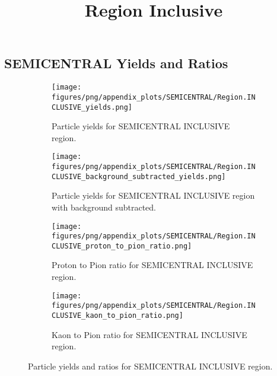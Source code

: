                 \subsection{SEMICENTRAL Yields and Ratios}
                \begin{figure}[H]
                    \title{Region Inclusive}
                    \begin{subfigure}[b]{0.5\textwidth}
                        \centering
                        \texttt{[image: figures/png/appendix\_plots/SEMICENTRAL/Region.INCLUSIVE\_yields.png]}
                        \caption{Particle yields for SEMICENTRAL INCLUSIVE region.}
                        \label{fig:appendix_SEMICENTRAL_INCLUSIVE_Inclusive_Yields}
                    \end{subfigure}
                    \begin{subfigure}[b]{0.5\textwidth}
                        \centering
                        \texttt{[image: figures/png/appendix\_plots/SEMICENTRAL/Region.INCLUSIVE\_background\_subtracted\_yields.png]}
                        \caption{Particle yields for SEMICENTRAL INCLUSIVE region with background subtracted.}
                        \label{fig:appendix_SEMICENTRAL_INCLUSIVE_Inclusive_Yields_Background_Subtracted}
                    \end{subfigure}
                    \begin{subfigure}[b]{0.5\textwidth}
                        \centering
                        \texttt{[image: figures/png/appendix\_plots/SEMICENTRAL/Region.INCLUSIVE\_proton\_to\_pion\_ratio.png]}
                        \caption{Proton to Pion ratio for SEMICENTRAL INCLUSIVE region.}
                        \label{fig:appendix_SEMICENTRAL_INCLUSIVE_Proton_to_Pion_Ratio}
                    \end{subfigure}
                    \begin{subfigure}[b]{0.5\textwidth}
                        \centering
                        \texttt{[image: figures/png/appendix\_plots/SEMICENTRAL/Region.INCLUSIVE\_kaon\_to\_pion\_ratio.png]}
                        \caption{Kaon to Pion ratio for SEMICENTRAL INCLUSIVE region.}
                        \label{fig:appendix_SEMICENTRAL_INCLUSIVE_Kaon_to_Pion_Ratio}
                    \end{subfigure}
                    \caption{Particle yields and ratios for SEMICENTRAL INCLUSIVE region.}
                    \label{fig:appendix_SEMICENTRAL_INCLUSIVE_Inclusive_Yields_and_Ratios}
                \end{figure}
